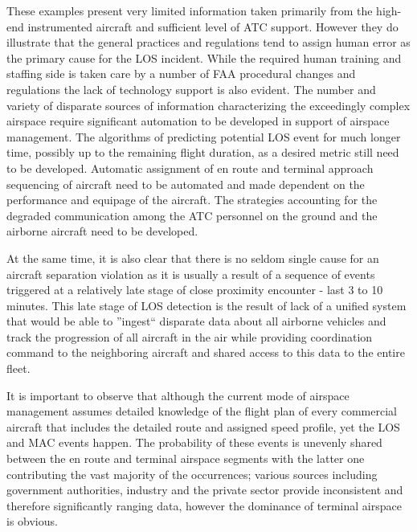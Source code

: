\documentclass[letter,onecolumn,12pt]{aiaa-tc}
\newcommand{\1}{1_n}
\begin{document}
These examples present very limited information taken primarily from the high-end instrumented aircraft and sufficient level of ATC support. However they do illustrate that the general practices and regulations tend to assign human error as the primary cause for the LOS incident. While the required human training and staffing side is taken care by a number of FAA procedural changes and regulations\cite{OIG_AR2013} the lack of technology support is also evident. The number and variety of disparate sources of information characterizing the exceedingly complex airspace require significant automation to be developed in support of airspace management. The algorithms of predicting potential LOS event for much longer time, possibly up to the remaining flight duration, as a desired metric still need to be developed. Automatic assignment of en route and terminal approach sequencing of aircraft need to be automated and made dependent on the performance and equipage of the aircraft. The strategies accounting for the degraded communication among the ATC personnel on the ground and the airborne aircraft need to be developed.

At the same time, it is also clear that there is no seldom single cause for an aircraft separation violation as it is usually a result of  a sequence of events triggered at a relatively late stage of close proximity encounter - last 3 to 10 minutes. This late stage of LOS detection is the result of lack of a unified system that would be able to ''ingest`` disparate data about all airborne vehicles and track the progression of all aircraft in the air while providing coordination command to the neighboring aircraft and shared access to this data to the entire fleet.

It is important to observe that although the current mode of airspace management assumes detailed knowledge of the flight plan of every commercial aircraft that includes the detailed route and assigned speed profile, yet the LOS and MAC events happen. The probability of these events is unevenly shared between the en route and terminal airspace segments with the latter one contributing the vast majority of the occurrences; various sources including government authorities, industry and the private sector provide inconsistent and therefore significantly ranging data, however the dominance of terminal airspace is obvious.
\end{document}
